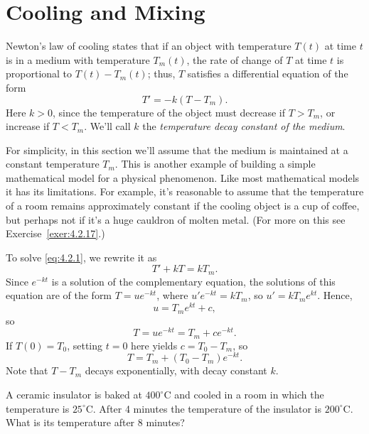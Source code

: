 \section{Cooling and Mixing}


\noindent
Newton's law of cooling states that if an object with temperature $T(t)$ at time $t$ is in a medium
with temperature $T_{m}(t)$, the rate of change of $T$ at time $t$ is proportional to
$T(t)-T_{m}(t)$; thus, $T$ satisfies a differential equation of the form
\begin{equation}
  \label{eq:4.2.1}T'=-k(T-T_{m}).
\end{equation}
Here $k>0$, since the temperature of the object must decrease if $T>T_{m}$, or increase if
$T<T_{m}$. We'll call $k$ the {\color{blue}\it temperature decay constant of the medium\/}.

For simplicity, in this section we'll assume that the medium is maintained at a constant temperature
$T_{m}$. This is another example of building a simple mathematical model for a physical phenomenon.
Like most mathematical models it has its limitations. For example, it's reasonable to assume that
the temperature of a room remains approximately constant if the cooling object is a cup of coffee,
but perhaps not if it's a huge cauldron of molten metal. (For more on this see
Exercise~\ref{exer:4.2.17}.)

To solve \eqref{eq:4.2.1}, we rewrite it as
\[
  T'+kT=kT_{m}.
\]
Since $e^{-kt}$ is a solution of the complementary equation, the solutions of this equation are of
the form $T=ue^{-kt}$, where $u'e^{-kt}=kT_{m}$, so $u'=kT_{m}e^{kt}$. Hence,
\[
  u=T_{m}e^{kt}+c,
\]
so
\[
  T=ue^{-kt}=T_{m}+ce^{-kt}.
\]
If $T(0)=T_{0}$, setting $t=0$ here yields $c=T_{0}-T_{m}$, so
\begin{equation}
  \label{eq:4.2.2}T=T_{m}+(T_{0}-T_{m})e^{-kt}.
\end{equation}
Note that $T-T_{m}$ decays exponentially, with decay constant $k$.

\begin{example}
  \label{example:4.2.1}\rm A ceramic insulator is baked at $400^{\circ}$C and cooled in a room in
  which the temperature is $25^{\circ}$C. After 4 minutes the temperature of the insulator is
  $200^{\circ}$C. What is its temperature after 8 minutes?
\end{example}

